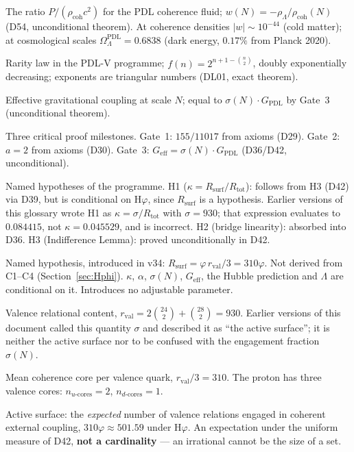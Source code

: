 \documentclass[11pt,a4paper]{article}
\theoremstyle{plain}
\theoremstyle{definition}
\theoremstyle{remark}
\newcommand{\Geff}{G_{\mathrm{eff}}}
\newcommand{\GPDL}{G_{\mathrm{PDL}}}
\newcommand{\rval}{r_{\mathrm{val}}}
\newcommand{\Rsurf}{R_{\mathrm{surf}}}
\newcommand{\Rtot}{R_{\mathrm{tot}}}
\newcommand{\sigmaN}{\sigma(N)}
\newcommand{\rhocoh}{\rho_{\mathrm{coh}}}
\begin{document}
\begin{description}[leftmargin=3.5cm, style=nextline]
\item[Equation of state $w(N)$] The ratio $P/(\rhocoh c^2)$ for the PDL coherence fluid; $w(N) = -\rho_\Lambda/\rhocoh(N)$ (D54, unconditional theorem). At coherence densities $|w| \sim 10^{-44}$ (cold matter); at cosmological scales $\Omega_\Lambda^{\mathrm{PDL}} = 0.6838$ (dark energy, $0.17\%$ from Planck 2020).
\item[$f(n)$] Rarity law in the PDL-V programme; $f(n) = 2^{n+1-\binom{n}{2}}$, doubly exponentially decreasing; exponents are triangular numbers (DL01, exact theorem).
\item[$\Geff(N)$] Effective gravitational coupling at scale $N$; equal to $\sigmaN\cdot\GPDL$ by Gate~3 (unconditional theorem).
\item[Gate 1, 2, 3] Three critical proof milestones. Gate~1: $155/11017$ from axioms (D29). Gate~2: $a=2$ from axioms (D30). Gate~3: $\Geff=\sigmaN\cdot\GPDL$ (D36/D42, unconditional).
\item[H1, H2, H3] Named hypotheses of the programme. H1 ($\kappa=\Rsurf/\Rtot$): follows from H3 (D42) via D39, but is \textcolor{hypothesisorange}{conditional on H$\varphi$}, since $\Rsurf$ is a hypothesis. \textcolor{negativered}{Earlier versions of this glossary wrote H1 as $\kappa=\sigma/R_{\mathrm{tot}}$ with $\sigma=930$; that expression evaluates to $0.084415$, not $\kappa=0.045529$, and is incorrect.} H2 (bridge linearity): absorbed into D36. H3 (Indifference Lemma): proved unconditionally in D42.
\item[H$\varphi$] Named hypothesis, introduced in v34: $\Rsurf=\varphi\,\rval/3=310\varphi$. Not derived from C1--C4 (Section~\ref{sec:Hphi}). $\kappa$, $\alpha$, $\sigmaN$, $\Geff$, the Hubble prediction and $\Lambda$ are conditional on it. Introduces no adjustable parameter.
\item[$\rval$] Valence relational content, $\rval=2\binom{24}{2}+\binom{28}{2}=930$. \textcolor{negativered}{Earlier versions of this document called this quantity $\sigma$ and described it as ``the active surface''; it is neither the active surface nor to be confused with the engagement fraction $\sigmaN$.}
\item[$r_{\mathrm{core}}$] Mean coherence core per valence quark, $\rval/3=310$. The proton has three valence cores: $n_{u\text{-cores}}=2$, $n_{d\text{-cores}}=1$.
\item[$\Rsurf$] Active surface: the \emph{expected} number of valence relations engaged in coherent external coupling, $310\varphi\approx501.59$ under H$\varphi$. An expectation under the uniform measure of D42, \textbf{not a cardinality} --- an irrational cannot be the size of a set.

\end{description}
\end{document}
